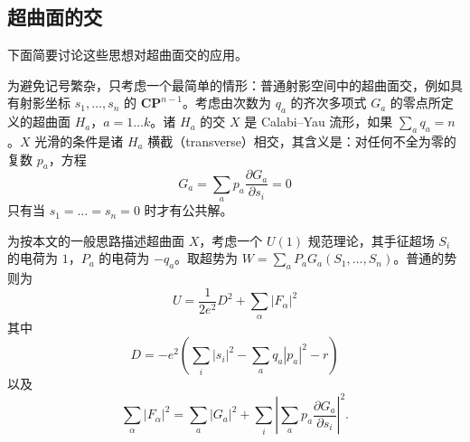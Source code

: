 \subsection{超曲面的交}

下面简要讨论这些思想对超曲面交的应用。

为避免记号繁杂，只考虑一个最简单的情形：普通射影空间中的超曲面交，例如具有射影坐标 $s_1,\ldots,s_n$ 的 $\mathbf{CP}^{n-1}$。考虑由次数为 $q_a$ 的齐次多项式 $G_a$ 的零点所定义的超曲面 $H_a$，$a=1\ldots k$。诸 $H_a$ 的交 $X$ 是 Calabi--Yau 流形，如果 $\sum_a q_a=n$。$X$ 光滑的条件是诸 $H_a$ 横截（transverse）相交，其含义是：对任何不全为零的复数 $p_a$，方程
\begin{equation}\tag{5.27}
G_a=\sum_a p_a\frac{\partial G_a}{\partial s_i}=0
\end{equation}
只有当 $s_1=\ldots=s_n=0$ 时才有公共解。



为按本文的一般思路描述超曲面 $X$，考虑一个 $U(1)$ 规范理论，其手征超场 $S_i$ 的电荷为 $1$，$P_a$ 的电荷为 $-q_a$。取超势为 $W=\sum_a P_aG_a(S_1,\ldots,S_n)$。普通的势则为
\begin{equation}\tag{5.28}
U=\frac{1}{2e^2}D^2+\sum_\alpha|F_\alpha|^2
\end{equation}
其中
\begin{equation}\tag{5.29}
D=-e^2\left(\sum_i|s_i|^2-\sum_a q_a|p_a|^2-r\right)
\end{equation}
\label{op:63}
以及
\begin{equation}\tag{5.30}
\sum_\alpha|F_\alpha|^2=\sum_a|G_a|^2+\sum_i\left|\sum_a p_a\frac{\partial G_a}{\partial s_i}\right|^2.
\end{equation}

